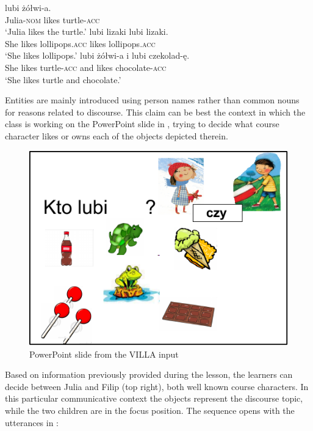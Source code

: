 \ea%
    \label{ex:08:1}
    \ea
    \label{ex:08:1a}
     {lubi} {żółwi-a.}\\
            Julia-\textsc{nom}  likes  turtle-\textsc{acc}\\
    \glt    ‘Julia likes the turtle.’
    \ex
    \label{ex:08:1b}
       {lubi}   {lizaki}     {lubi}   {lizaki.}\\
            She  likes  lollipops\textsc{.acc}   likes  lollipops\textsc{.acc}\\
    \glt    ‘She likes lollipops.’
    \ex
    \label{ex:08:1c}
       {lubi}   {żółwi-a}   {i}   {lubi}   {czekolad-ę.}\\
            She  likes  turtle-\textsc{acc}  and  likes  chocolate-\textsc{acc}\\
    \glt    ‘She likes turtle and chocolate.’
    \z
\z

Entities are mainly introduced using person names rather than common nouns for reasons related to discourse. This claim can be best  the context in which the class is working on the PowerPoint slide in , trying to decide what course character likes or owns each of the objects depicted therein.

\begin{figure}
    \includegraphics[width=\textwidth]{figures/08-1.pdf}
    \caption{PowerPoint slide from the VILLA input}
    \label{fig:08:1}
\end{figure}

Based on information previously provided during the lesson, the learners can decide between Julia and Filip (top right), both well known course characters. In this particular communicative context the objects represent the discourse topic, while the two children are in the focus position. The sequence opens with the utterances in :

